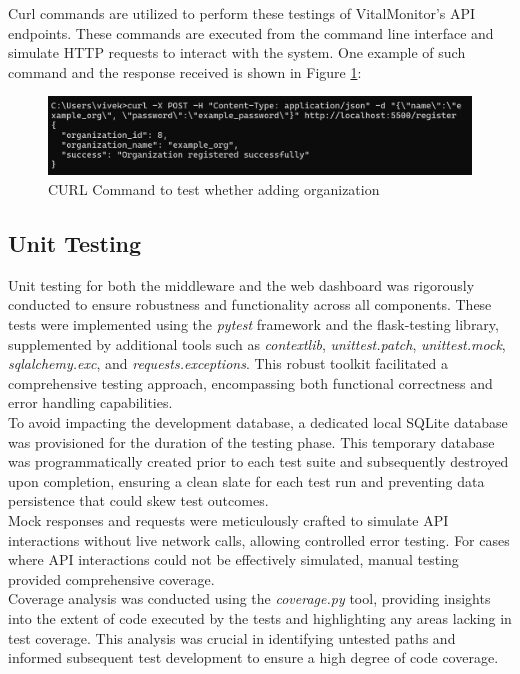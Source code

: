 Curl commands are utilized to perform these testings of VitalMonitor's API endpoints. These commands are executed from the command line interface and simulate HTTP requests to interact with the system. One example of such command and the response received is shown in Figure \ref{fig:curl-command}:

\begin{figure}[h!]
    \centering
    \includegraphics[width=1\linewidth]{images/curl-command.png}
    \caption{CURL Command to test whether adding organization }
    \label{fig:curl-command}
\end{figure}


\subsection{Unit Testing}
Unit testing for both the middleware and the web dashboard was rigorously conducted to ensure robustness and functionality across all components. These tests were implemented using the \textit{pytest} framework and the flask-testing library, supplemented by additional tools such as \textit{contextlib}, \textit{unittest.patch}, \textit{unittest.mock}, \textit{sqlalchemy.exc}, and \textit{requests.exceptions}. This robust toolkit facilitated a comprehensive testing approach, encompassing both functional correctness and error handling capabilities. \\

\noindent To avoid impacting the development database, a dedicated local SQLite database was provisioned for the duration of the testing phase. This temporary database was programmatically created prior to each test suite and subsequently destroyed upon completion, ensuring a clean slate for each test run and preventing data persistence that could skew test outcomes.\\

\noindent Mock responses and requests were meticulously crafted to simulate API interactions without live network calls, allowing controlled error testing. For cases where API interactions could not be effectively simulated, manual testing provided comprehensive coverage.\\

\noindent Coverage analysis was conducted using the \textit{coverage.py} tool, providing insights into the extent of code executed by the tests and highlighting any areas lacking in test coverage. This analysis was crucial in identifying untested paths and informed subsequent test development to ensure a high degree of code coverage.\\

